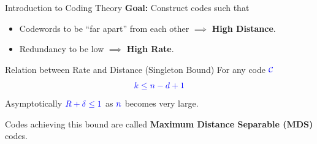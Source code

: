 \documentclass[10pt,handout]{beamer}
\begin{document}
\begin{frame}{Introduction to Coding Theory}
	\textbf{Goal:} Construct codes such that
	\begin{itemize}
		\item Codewords to be ``far apart'' from each other ${\implies}$ \textbf{High Distance}.\pause
		\item Redundancy to be low ${\implies}$ \textbf{High Rate}.
	\end{itemize}\pause

	\begin{block}{Relation between Rate and Distance (Singleton Bound)}
		For any code $\textcolor{blue}{\textcolor{blue}{\mathcal{C}}}$ $$\textcolor{blue}{\textcolor{blue}{k\leq n-d+1}}$$
		Asymptotically $\textcolor{blue}{\textcolor{blue}{R+\delta\leq 1}}$ as $\textcolor{blue}{\textcolor{blue}{n}}$ becomes very large.
	\end{block}\pause

	Codes achieving this bound are called \textbf{Maximum Distance Separable (MDS)} codes.
\end{frame}
\end{document}

